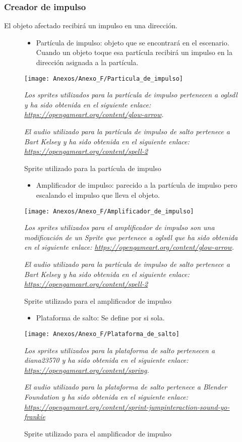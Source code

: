 \subsubsection{Creador de impulso}
El objeto afectado recibirá un impulso en una dirección.
\begin{figure}[h]
\begin{itemize}
\item
Partícula de impulso: objeto que se encontrará en el escenario. Cuando un objeto toque esa partícula recibirá un impulso en la dirección asignada a la partícula.
\end{itemize}
\centering
\texttt{[image: Anexos/Anexo\_F/Particula\_de\_impulso]}
\caption{Sprite utilizado para la partícula de impulso}
\raggedright
\textit{Los sprites utilizados para la partícula de impulso pertenecen a oglsdl y ha sido obtenida en el siguiente enlace: \url{https://opengameart.org/content/glow-arrow}.}

\textit{El audio utilizado para la partícula de impulso de salto pertenece a Bart Kelsey y ha sido obtenida en el siguiente enlace: \url{https://opengameart.org/content/spell-2}}
\end{figure}

\begin{figure}[h]
\begin{itemize}
\item
Amplificador de impulso: parecido a la partícula de impulso pero escalando el impulso que lleva el objeto.
\end{itemize}
\centering
\texttt{[image: Anexos/Anexo\_F/Amplificador\_de\_impulso]}
\caption{Sprite utilizado para el amplificador de impulso}
\raggedright
\textit{Los sprites utilizados para el amplificador de impulso son una modificación de un Sprite que pertenece a oglsdl que ha sido obtenida en el siguiente enlace: \url{https://opengameart.org/content/glow-arrow}.}

\textit{El audio utilizado para la partícula de impulso de salto pertenece a Bart Kelsey y ha sido obtenida en el siguiente enlace: \url{https://opengameart.org/content/spell-2}}
\end{figure}

\begin{figure}[h]
\begin{itemize}
\item
Plataforma de salto: Se define por si sola.
\end{itemize}
\centering
\texttt{[image: Anexos/Anexo\_F/Plataforma\_de\_salto]}
\caption{Sprite utilizado para el amplificador de impulso}
\raggedright
\textit{Los sprites utilizados para la plataforma de salto pertenecen a diana23570 y ha sido obtenida en el siguiente enlace: \url{https://opengameart.org/content/spring}.}

\textit{El audio utilizado para la plataforma de salto pertenece a Blender Foundation y ha sido obtenida en el siguiente enlace:  \url{https://opengameart.org/content/sprint-jumpinteraction-sound-yo-frankie}}
\end{figure}


